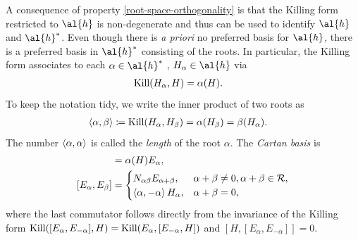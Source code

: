 A consequence of property \ref{root-space-orthogonality} is that the Killing form restricted to $\al{h}$ is non-degenerate and thus can be used to identify $\al{h}$ and $\al{h}^*$. Even though there is \emph{a priori} no preferred basis for $\al{h}$, there is a preferred basis in $\al{h}^*$ consisting of the roots. In particular, the Killing form associates to each $\alpha \in \al{h}^*$ %
, $H_{\alpha} \in \al{h}$ via
\begin{align}
\text{Kill}(H_{\alpha},H) &= \alpha(H).
\end{align}
To keep the notation tidy, we write the inner product of two roots as
\begin{align}
\braket{\alpha,\beta} &\coloneqq \text{Kill}(H_{\alpha},H_{\beta}) = \alpha(H_{\beta}) = \beta(H_{\alpha}).
\end{align}
The number $\braket{\alpha,\alpha}$ is called the \emph{length} of the root $\alpha$. The \emph{Cartan basis} is
\begin{align}
[H,E_{\alpha}] &= \alpha(H) E_{\alpha}, \\
[E_{\alpha}, E_{\beta}] &=
\begin{cases}
N_{\alpha \beta} E_{\alpha + \beta}, & \alpha + \beta \neq 0, \alpha + \beta \in \mathcal{R}, \\
\braket{\alpha,-\alpha} H_{\alpha}, & \alpha + \beta = 0,
\end{cases}
\end{align}
where the last commutator follows directly from the invariance of the Killing form $\text{Kill}([E_{\alpha}, E_{-\alpha}],H) = \text{Kill}(E_{\alpha},[E_{-\alpha}, H])$ and $[H,[E_{\alpha},E_{-\alpha}]]=0$.


